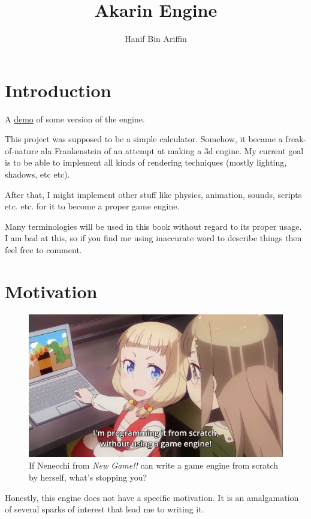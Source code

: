 \documentclass[a4paper,14pt]{extbook}
\title{Akarin Engine}
\author{Hanif Bin Ariffin}
\begin{document}
\maketitle
\tableofcontents

\newpage
\section{Introduction}

A \href{https://www.youtube.com/watch?v=BbLW4ZJnaLM}{demo} of some version of the engine.

This project was supposed to be a simple calculator.
Somehow, it became a freak-of-nature ala Frankenstein of an attempt at making a 3d engine.
My current goal is to be able to implement all kinds of rendering techniques (mostly lighting, shadows, etc etc).

After that, I might implement other stuff like physics, animation, sounds, scripts etc. etc. for it to become a proper game engine.

Many terminologies will be used in this book without regard to its proper usage.
I am bad at this, so if you find me using inaccurate word to describe things then feel free to comment.

\newpage
\section{Motivation}

\begin{figure}[h]
    \includegraphics[width=\textwidth]{.images/nenechi_writes_game_engine.png}
    \caption{If Nenecchi from \textit{New Game!!} can write a game engine from scratch by herself, what's stopping you?}
\end{figure}

Honestly, this engine does not have a specific motivation.
It is an amalgamation of several sparks of interest that lead me to writing it.
\end{document}
